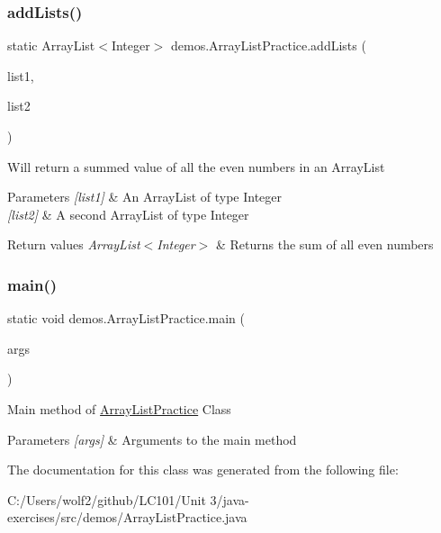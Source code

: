 \subsubsection{\texorpdfstring{addLists()}{addLists()}}
{\footnotesize\ttfamily static Array\+List$<$Integer$>$ demos.\+Array\+List\+Practice.\+add\+Lists (\begin{DoxyParamCaption}\item[{Array\+List$<$ Integer $>$}]{list1,  }\item[{Array\+List$<$ Integer $>$}]{list2 }\end{DoxyParamCaption})\hspace{0.3cm}{\ttfamily [static]}}

Will return a summed value of all the even numbers in an Array\+List 
\begin{DoxyParams}{Parameters}
{\em \mbox{[}list1\mbox{]}} & An Array\+List of type Integer \\
\hline
{\em \mbox{[}list2\mbox{]}} & A second Array\+List of type Integer \\
\hline
\end{DoxyParams}

\begin{DoxyRetVals}{Return values}
{\em Array\+List$<$\+Integer$>$} & Returns the sum of all even numbers \\
\hline
\end{DoxyRetVals}
\mbox{\label{classdemos_1_1_array_list_practice_a8b4f19ba3c6af345fa135554f632426f}} 
\subsubsection{\texorpdfstring{main()}{main()}}
{\footnotesize\ttfamily static void demos.\+Array\+List\+Practice.\+main (\begin{DoxyParamCaption}\item[{String \mbox{[}$\,$\mbox{]}}]{args }\end{DoxyParamCaption})\hspace{0.3cm}{\ttfamily [static]}}

Main method of \mbox{\hyperlink{classdemos_1_1_array_list_practice}{Array\+List\+Practice}} Class 
\begin{DoxyParams}{Parameters}
{\em \mbox{[}args\mbox{]}} & Arguments to the main method \\
\hline
\end{DoxyParams}


The documentation for this class was generated from the following file\+:\begin{DoxyCompactItemize}
\item 
C\+:/\+Users/wolf2/github/\+L\+C101/\+Unit 3/java-\/exercises/src/demos/Array\+List\+Practice.\+java\end{DoxyCompactItemize}
